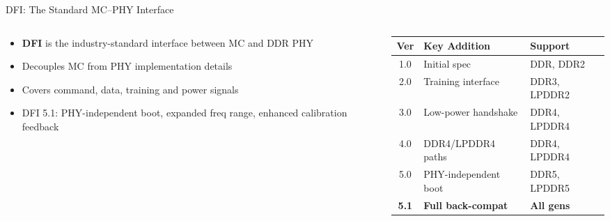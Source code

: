 \documentclass[aspectratio=169,10pt]{beamer}
\begin{document}
\begin{frame}[fragile]{DFI: The Standard MC--PHY Interface}
\begin{columns}[T]

\begin{column}{0.38\textwidth}
  \vspace{4pt}
  \begin{itemize}\setlength\itemsep{7pt}\small
    \item \textbf{DFI} is the industry-standard interface between MC and DDR PHY
    \item Decouples MC from PHY implementation details
    \item Covers command, data, training and power signals
    \item DFI 5.1: PHY-independent boot, expanded freq range, enhanced calibration feedback
  \end{itemize}
\end{column}

\begin{column}{0.58\textwidth}
  \centering\vspace{4pt}

  \vspace{10pt}
  {\scriptsize
  \begin{tabular}{@{}clp{28mm}@{}}
    \toprule
    \textbf{Ver} & \textbf{Key Addition} & \textbf{Support}\\
    \midrule
    1.0 & Initial spec          & DDR, DDR2\\
    2.0 & Training interface    & DDR3, LPDDR2\\
    3.0 & Low-power handshake   & DDR4, LPDDR4\\
    4.0 & DDR4/LPDDR4 paths     & DDR4, LPDDR4\\
    5.0 & PHY-independent boot  & DDR5, LPDDR5\\
    \rowcolor{ddrgold!30}
    \textbf{5.1} & \textbf{Full back-compat} & \textbf{All gens}\\
    \bottomrule
  \end{tabular}}
\end{column}
\end{columns}
\end{frame}
\end{document}
